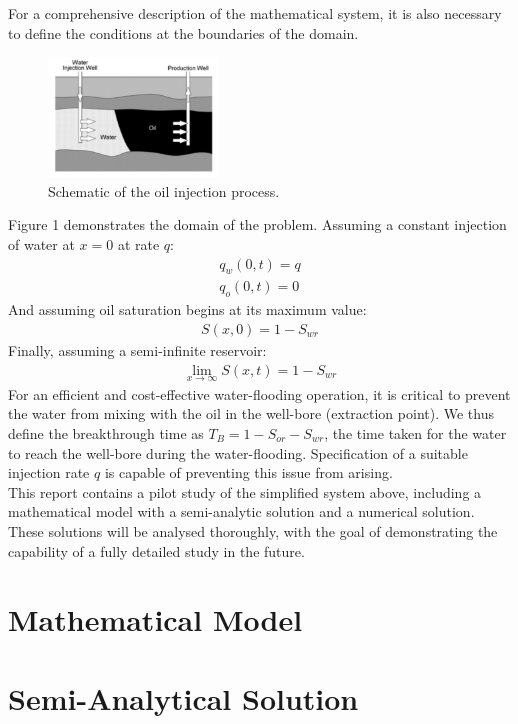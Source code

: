 \documentclass[11pt]{article}
\begin{document}
For a comprehensive description of the mathematical system, it is also necessary to define the conditions at the boundaries of the domain.
\begin{figure}[!h]
\centering
\includegraphics[width=0.4\textwidth]{injectionschematic.png}
\caption{Schematic of the oil injection process.}
\end{figure}
Figure 1 demonstrates the domain of the problem. Assuming a constant injection of water at $x=0$ at rate $q$:
\begin{eqnarray}
q_w(0,t) = q\\
q_o(0,t) = 0
\end{eqnarray}
And assuming oil saturation begins at its maximum value:
\begin{eqnarray}
S(x,0)=1-S_{wr}
\end{eqnarray}
Finally, assuming a semi-infinite reservoir:
\begin{eqnarray}
\lim_{x\to\infty} S(x,t) = 1-S_{wr}
\end{eqnarray}
For an efficient and cost-effective water-flooding operation, it is critical to prevent the water from mixing with the oil in the well-bore (extraction point). We thus define the breakthrough time as $T_B = 1-S_{or}-S_{wr}$, the time taken for the water to reach the well-bore during the water-flooding. Specification of a suitable injection rate $q$ is capable of preventing this issue from arising.\\

This report contains a pilot study of the simplified system above, including a mathematical model with a semi-analytic solution and a numerical solution. These solutions will be analysed thoroughly, with the goal of demonstrating the capability of a fully detailed study in the future. 
\smallbreak
\section{Mathematical Model}

\smallbreak
\section{Semi-Analytical Solution}
\end{document}
